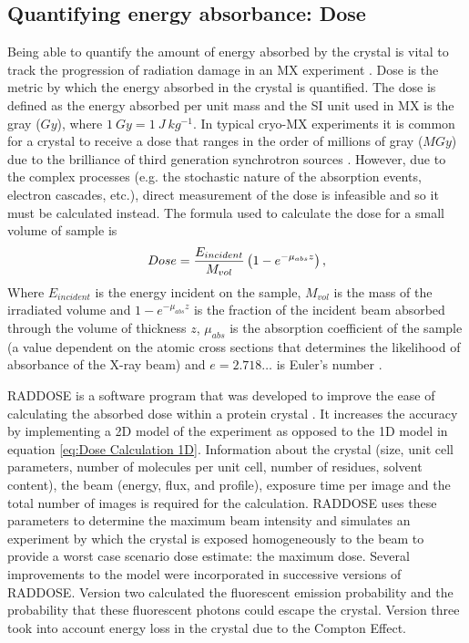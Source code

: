    \subsection{Quantifying energy absorbance: Dose}
    \label{sub:Quantifying energy absorbance: Dose}
        Being able to quantify the amount of energy absorbed by the crystal is vital to track the progression of radiation damage in an MX experiment \cite{blake1962,holton2009}.
        Dose is the metric by which the energy absorbed in the crystal is quantified. The dose is defined as the energy absorbed per unit mass and the SI unit used in MX is the gray ($Gy$), where $1\ Gy = 1\ J\ kg^{-1}$.
        In typical cryo-MX experiments it is common for a crystal to receive a dose that ranges in the order of millions of gray ($MGy$) \cite{garman2010} due to the brilliance of third generation synchrotron sources \cite{mitchell1999}.
        However, due to the complex processes (e.g. the stochastic nature of the absorption events, electron cascades, etc.), direct measurement of the dose is infeasible and so it must be calculated instead.
        The formula used to calculate the dose for a small volume of sample is
        \begin{equation}
            Dose = \frac{E_{incident}}{M_{vol}} \left(1- e^{-\mu_{abs}z}\right),
            \label{eq:Dose Calculation 1D}
        \end{equation}
        Where $E_{incident}$ is the energy incident on the sample, $M_{vol}$ is the mass of the irradiated volume and $1- e^{-\mu_{abs}z}$ is the fraction of the incident beam absorbed through the volume of thickness $z$, $\mu_{abs}$ is the absorption coefficient of the sample (a value dependent on the atomic cross sections that determines the likelihood of absorbance of the X-ray beam) and $e = 2.718 \ldots$ is Euler's number \cite{zeldin2013thesis}.

        RADDOSE is a software program that was developed to improve the ease of calculating the absorbed dose within a protein crystal \cite{murray2004}. It increases the accuracy by implementing a 2D model of the experiment as opposed to the 1D model in equation \ref{eq:Dose Calculation 1D}.
        Information about the crystal (size, unit cell parameters, number of molecules per unit cell, number of residues, solvent content), the beam (energy, flux, and profile), exposure time per image and the total number of images is required for the calculation.
        RADDOSE uses these parameters to determine the maximum beam intensity and simulates an experiment by which the crystal is exposed homogeneously to the beam to provide a worst case scenario dose estimate: the maximum dose.
        Several improvements to the model were incorporated in successive versions of RADDOSE.
        Version two \cite{pait2009} calculated the fluorescent emission probability and the probability that these fluorescent photons could escape the crystal.
        Version three \cite{pait2010} took into account energy loss in the crystal due to the Compton Effect.

